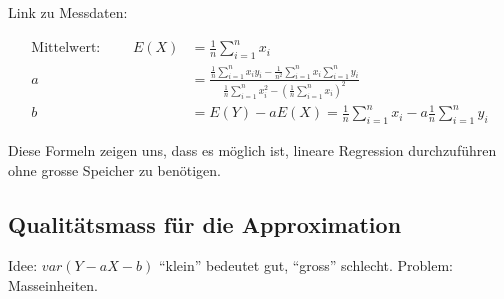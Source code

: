 \documentclass[10pt,a4paper]{scrartcl}
\DeclareMathOperator{\var}{var}
\DeclareMathOperator{\cov}{cov}
\begin{document}

Link zu Messdaten:

\begin{align*}
\text{Mittelwert: } \qquad E(X) & = \frac{1}{n}\sum_{i=1}^n x_i \\
                              a & = \frac{\frac{1}{n}\sum_{i=1}^n x_iy_i - \frac{1}{n^2}\sum_{i=1}^n x_i\sum_{i=1}^n y_i}{\frac{1}{n}\sum_{i=1}^n x_i^2 - \left(\frac{1}{n}\sum_{i=1}^n x_i\right)^2} \\
                              b & = E(Y) - aE(X) = \frac{1}{n}\sum_{i=1}^n x_i - a\frac{1}{n}\sum_{i=1}^n y_i
\end{align*}

Diese Formeln zeigen uns, dass es möglich ist, lineare Regression durchzuführen ohne grosse Speicher zu benötigen.

\subsection{Qualitätsmass für die Approximation}
Idee: $var(Y-aX-b)$ ``klein'' bedeutet gut, ``gross'' schlecht. Problem: Masseinheiten.
\end{document}
